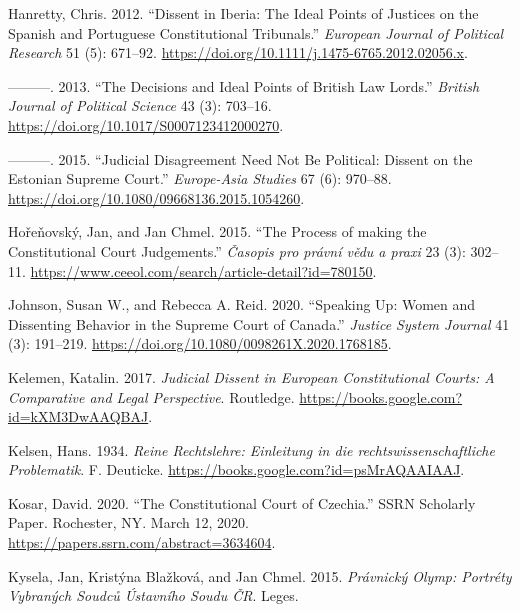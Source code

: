 \documentclass[
  11pt,
]{article}
\newlength{\cslhangindent}
\newenvironment{CSLReferences}[2] %
 {\begin{list}{}{%
  \setlength{\itemindent}{0pt}
  \setlength{\leftmargin}{0pt}
  \setlength{\parsep}{0pt}
  \ifodd #1
   \setlength{\leftmargin}{\cslhangindent}
   \setlength{\itemindent}{-1\cslhangindent}
  \fi
  \setlength{\itemsep}{#2\baselineskip}}}
 {\end{list}}
\begin{document}
\begin{CSLReferences}{1}{0}
Hanretty, Chris. 2012. {``Dissent in {Iberia}: {The} Ideal Points of Justices on the {Spanish} and {Portuguese Constitutional Tribunals}.''} \emph{European Journal of Political Research} 51 (5): 671--92. \url{https://doi.org/10.1111/j.1475-6765.2012.02056.x}.

---------. 2013. {``The {Decisions} and {Ideal Points} of {British Law Lords}.''} \emph{British Journal of Political Science} 43 (3): 703--16. \url{https://doi.org/10.1017/S0007123412000270}.

---------. 2015. {``Judicial {Disagreement} Need Not Be {Political}: {Dissent} on the {Estonian Supreme Court}.''} \emph{Europe-Asia Studies} 67 (6): 970--88. \url{https://doi.org/10.1080/09668136.2015.1054260}.

Hořeňovský, Jan, and Jan Chmel. 2015. {``The Process of making the Constitutional Court Judgements.''} \emph{Časopis pro právní vědu a praxi} 23 (3): 302--11. \url{https://www.ceeol.com/search/article-detail?id=780150}.

Johnson, Susan W., and Rebecca A. Reid. 2020. {``Speaking {Up}: {Women} and {Dissenting Behavior} in the {Supreme Court} of {Canada}.''} \emph{Justice System Journal} 41 (3): 191--219. \url{https://doi.org/10.1080/0098261X.2020.1768185}.

Kelemen, Katalin. 2017. \emph{Judicial {Dissent} in {European Constitutional Courts}: {A Comparative} and {Legal Perspective}}. Routledge. \url{https://books.google.com?id=kXM3DwAAQBAJ}.

Kelsen, Hans. 1934. \emph{Reine Rechtslehre: Einleitung in die rechtswissenschaftliche Problematik}. F. Deuticke. \url{https://books.google.com?id=psMrAQAAIAAJ}.

Kosar, David. 2020. {``The {Constitutional Court} of {Czechia}.''} SSRN Scholarly Paper. Rochester, NY. March 12, 2020. \url{https://papers.ssrn.com/abstract=3634604}.

Kysela, Jan, Kristýna Blažková, and Jan Chmel. 2015. \emph{Právnický {Olymp}: Portréty Vybraných Soudců {Ústavního} Soudu {ČR}}. Leges.


\end{CSLReferences}
\end{document}
